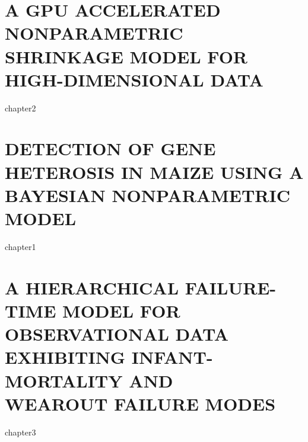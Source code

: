 \documentclass[11pt]{isuthesis}
\begin{document}
\newtoggle{thesis}
\toggletrue{thesis}



\tableofcontents
{} \cleardoublepage {}
{}
\listoftables
\cleardoublepage {} {}
\listoffigures

\newpage  %


\newpage         %

\newpage
{}



\chapter{A GPU ACCELERATED NONPARAMETRIC SHRINKAGE
MODEL FOR HIGH-DIMENSIONAL DATA}
{chapter2}

\chapter{DETECTION OF GENE HETEROSIS IN MAIZE USING A BAYESIAN NONPARAMETRIC MODEL}
{chapter1}

\chapter{A HIERARCHICAL FAILURE-TIME MODEL FOR OBSERVATIONAL DATA EXHIBITING INFANT-MORTALITY AND\\ WEAROUT FAILURE MODES}
{chapter3}



 \cleardoublepage {}

\renewcommand{\bibname}{\centerline{BIBLIOGRAPHY}}

\end{document}
